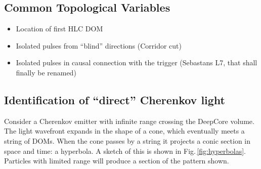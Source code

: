 \documentclass[../Main.tex]{subfiles}
\begin{document}
\subsection{Common Topological Variables}\label{sec:OtherTopoVariables}

\begin{itemize}
\item{Location of first HLC DOM}

\item{Isolated pulses from ``blind'' directions (Corridor cut)}

\item{Isolated pulses in causal connection with the trigger (Sebastans L7, that shall finally be renamed)}
\end{itemize}

\subsection{Identification of ``direct'' Cherenkov light}
Consider a Cherenkov emitter with infinite range crossing the DeepCore volume. The light wavefront expands in the shape of a cone, which eventually meets a string of DOMs. When the cone passes by a string it projects a conic section in space and time: a hyperbola. A sketch of this is shown in Fig.\,\ref{fig:hyperbolas}. Particles with limited range will produce a section of the pattern shown.
\end{document}
